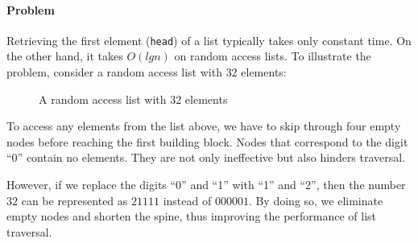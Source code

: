 \documentclass[\main/thesis.tex]{subfiles}
\begin{document}
\paragraph{Problem}

Retrieving the first element ({\lstinline|head|}) of a list typically takes
only constant time. On the other hand, it takes $ O(lg n) $ on random access lists.
To illustrate the problem, consider a random access list with $ 32 $ elements:

\begin{figure}[H]
    \centering
\caption{A random access list with 32 elements}
\label{figure:6}
\end{figure}


To access any elements from the list above, we have to skip
through four empty nodes before reaching the first building block.
Nodes that correspond to the digit ``0'' contain no elements.
They are not only ineffective but also hinders traversal.

However, if we replace the digits ``0'' and ``1'' with ``1'' and ``2'',
then the number $ 32 $ can be represented as $ 21111 $ instead of $ 000001 $.
By doing so, we eliminate empty nodes and shorten the spine, thus improving
the performance of list traversal.
\end{document}
